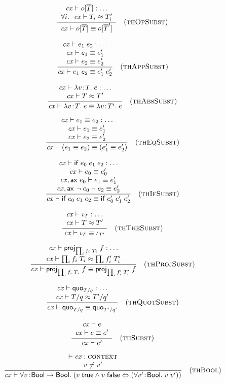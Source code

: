\[
\frac{\begin{array}{c}\mathit{cx}\vdash o[\overline{T}]:\ldots\\\forall i.\ \ \mathit{cx}\vdash T_i\approx T_i'\end{array}}{\mathit{cx}\vdash o[\overline{T}]\equiv o[\overline{T}']}\quad\mbox{(\textsc{thOpSubst})}
\]

\[
\frac{\begin{array}{c}\mathit{cx}\vdash e_1\;e_2:\ldots\\\mathit{cx}\vdash e_1\equiv e_1'\\\mathit{cx}\vdash e_2\equiv e_2'\end{array}}{\mathit{cx}\vdash e_1\;e_2\equiv e_1'\;e_2'}\quad\mbox{(\textsc{thAppSubst})}
\]

\[
\frac{\begin{array}{c}\mathit{cx}\vdash\lambda v\!:\!T.\;e:\ldots\\\mathit{cx}\vdash T\approx T'\end{array}}{\mathit{cx}\vdash\lambda v\!:\!T.\;e\equiv\lambda v\!:\!T'.\;e}\quad\mbox{(\textsc{thAbsSubst})}
\]

\[
\frac{\begin{array}{c}\mathit{cx}\vdash e_1\equiv e_2:\ldots\\\mathit{cx}\vdash e_1\equiv e_1'\\\mathit{cx}\vdash e_2\equiv e_2'\end{array}}{\mathit{cx}\vdash(e_1\equiv e_2)\equiv(e_1'\equiv e_2')}\quad\mbox{(\textsc{thEqSubst})}
\]

\[
\frac{\begin{array}{c}\mathit{cx}\vdash\mathsf{if}\;e_0\;e_1\;e_2:\ldots\\\mathit{cx}\vdash e_0\equiv e_0'\\\mathit{cx},\mathsf{ax}\ e_0\vdash e_1\equiv e_1'\\\mathit{cx},\mathsf{ax}\ \neg\;e_0\vdash e_2\equiv e_2'\end{array}}{\mathit{cx}\vdash\mathsf{if}\;e_0\;e_1\;e_2\equiv\mathsf{if}\;e_0'\;e_1'\;e_2'}\quad\mbox{(\textsc{thIfSubst})}
\]

\[
\frac{\begin{array}{c}\mathit{cx}\vdash\iota_{T}:\ldots\\\mathit{cx}\vdash T\approx T'\end{array}}{\mathit{cx}\vdash\iota_{T}\equiv\iota_{T'}}\quad\mbox{(\textsc{thTheSubst})}
\]

\[
\frac{\begin{array}{c}\mathit{cx}\vdash\mathsf{proj}_{\prod_{i}f_i\;T_i}\;{f}:\ldots\\\mathit{cx}\vdash\prod_{i}f_i\;T_i\approx\prod_{i}f_i'\;T_i'\end{array}}{\mathit{cx}\vdash\mathsf{proj}_{\prod_{i}f_i\;T_i}\;{f}\equiv\mathsf{proj}_{\prod_{i}f_i'\;T_i'}\;{f}}\quad\mbox{(\textsc{thProjSubst})}
\]


\[
\frac{\begin{array}{c}\mathit{cx}\vdash\mathsf{quo}_{T/q}:\ldots\\\mathit{cx}\vdash T/q\approx T'/q'\end{array}}{\mathit{cx}\vdash\mathsf{quo}_{T/q}\equiv\mathsf{quo}_{T'/q'}}\quad\mbox{(\textsc{thQuotSubst})}
\]


\[
\frac{\begin{array}{c}\mathit{cx}\vdash e\\\mathit{cx}\vdash e\equiv e'\end{array}}{\mathit{cx}\vdash e'}\quad\mbox{(\textsc{thSubst})}
\]


\[
\frac{\begin{array}{c}\vdash\mathit{cx}:\textsc{context}\\v\neq v'\end{array}}{\mathit{cx}\vdash\forall v\!:\!\mathsf{Bool}\to\mathsf{Bool}.\;(v\;\mathsf{true}\wedge v\;\mathsf{false}\Leftrightarrow(\forall v'\!:\!\mathsf{Bool}.\;v\;v'))}\quad\mbox{(\textsc{thBool})}
\]

